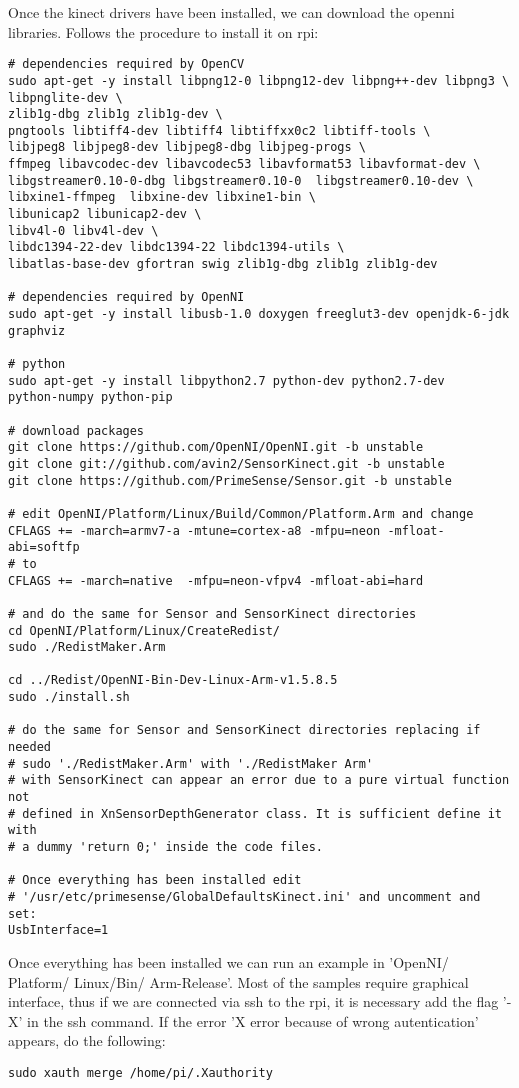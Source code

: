 Once the kinect drivers have been installed, we can download the openni libraries. Follows the procedure to install it on rpi:
\begin{verbatim}
# dependencies required by OpenCV
sudo apt-get -y install libpng12-0 libpng12-dev libpng++-dev libpng3 \
libpnglite-dev \
zlib1g-dbg zlib1g zlib1g-dev \
pngtools libtiff4-dev libtiff4 libtiffxx0c2 libtiff-tools \
libjpeg8 libjpeg8-dev libjpeg8-dbg libjpeg-progs \
ffmpeg libavcodec-dev libavcodec53 libavformat53 libavformat-dev \
libgstreamer0.10-0-dbg libgstreamer0.10-0  libgstreamer0.10-dev \
libxine1-ffmpeg  libxine-dev libxine1-bin \
libunicap2 libunicap2-dev \
libv4l-0 libv4l-dev \
libdc1394-22-dev libdc1394-22 libdc1394-utils \
libatlas-base-dev gfortran swig zlib1g-dbg zlib1g zlib1g-dev

# dependencies required by OpenNI
sudo apt-get -y install libusb-1.0 doxygen freeglut3-dev openjdk-6-jdk 
graphviz

# python
sudo apt-get -y install libpython2.7 python-dev python2.7-dev 
python-numpy python-pip

# download packages
git clone https://github.com/OpenNI/OpenNI.git -b unstable 
git clone git://github.com/avin2/SensorKinect.git -b unstable
git clone https://github.com/PrimeSense/Sensor.git -b unstable

# edit OpenNI/Platform/Linux/Build/Common/Platform.Arm and change
CFLAGS += -march=armv7-a -mtune=cortex-a8 -mfpu=neon -mfloat-abi=softfp 
# to
CFLAGS += -march=native  -mfpu=neon-vfpv4 -mfloat-abi=hard

# and do the same for Sensor and SensorKinect directories
cd OpenNI/Platform/Linux/CreateRedist/
sudo ./RedistMaker.Arm

cd ../Redist/OpenNI-Bin-Dev-Linux-Arm-v1.5.8.5
sudo ./install.sh

# do the same for Sensor and SensorKinect directories replacing if needed
# sudo './RedistMaker.Arm' with './RedistMaker Arm'
# with SensorKinect can appear an error due to a pure virtual function not
# defined in XnSensorDepthGenerator class. It is sufficient define it with
# a dummy 'return 0;' inside the code files.

# Once everything has been installed edit 
# '/usr/etc/primesense/GlobalDefaultsKinect.ini' and uncomment and set:
UsbInterface=1
\end{verbatim}
Once everything has been installed we can run an example in 'OpenNI/ Platform/ Linux/Bin/ Arm-Release'. Most of the samples require graphical interface, thus if we are connected via ssh to the rpi, it is necessary add the flag '-X' in the ssh command. If the error 'X error because of wrong autentication' appears, do the following:
\begin{verbatim}
sudo xauth merge /home/pi/.Xauthority
\end{verbatim}
